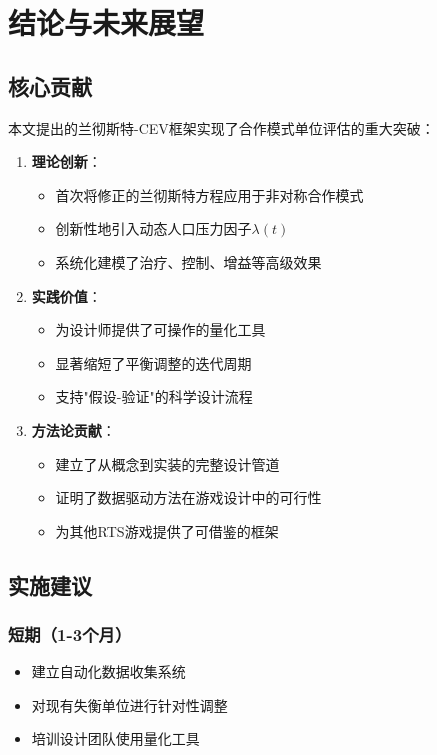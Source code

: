 \documentclass[a4paper,12pt]{article}
\begin{document}
\section{结论与未来展望}

\subsection{核心贡献}
本文提出的兰彻斯特-CEV框架实现了合作模式单位评估的重大突破：

\begin{enumerate}
\item \textbf{理论创新}：
   \begin{itemize}
   \item 首次将修正的兰彻斯特方程应用于非对称合作模式
   \item 创新性地引入动态人口压力因子$\lambda(t)$
   \item 系统化建模了治疗、控制、增益等高级效果
   \end{itemize}

\item \textbf{实践价值}：
   \begin{itemize}
   \item 为设计师提供了可操作的量化工具
   \item 显著缩短了平衡调整的迭代周期
   \item 支持"假设-验证"的科学设计流程
   \end{itemize}

\item \textbf{方法论贡献}：
   \begin{itemize}
   \item 建立了从概念到实装的完整设计管道
   \item 证明了数据驱动方法在游戏设计中的可行性
   \item 为其他RTS游戏提供了可借鉴的框架
   \end{itemize}
\end{enumerate}

\subsection{实施建议}

\subsubsection{短期（1-3个月）}
\begin{itemize}
\item 建立自动化数据收集系统
\item 对现有失衡单位进行针对性调整
\item 培训设计团队使用量化工具
\end{itemize}
\end{document}
